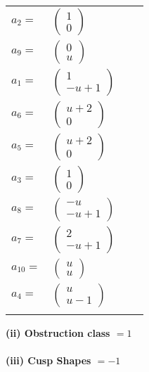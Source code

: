 \documentclass[1p]{elsarticle_modified}
\theoremstyle{definition}
\begin{document}
\begin{tabular}{m{7pt} m{180pt} m{7pt} m{180pt} }
\flushright $a_{2}=$&$\begin{pmatrix}1\\0\end{pmatrix}$ \\
\flushright $a_{9}=$&$\begin{pmatrix}0\\u\end{pmatrix}$ \\
\flushright $a_{1}=$&$\begin{pmatrix}1\\- u+1\end{pmatrix}$ \\
\flushright $a_{6}=$&$\begin{pmatrix}u+2\\0\end{pmatrix}$ \\
\flushright $a_{5}=$&$\begin{pmatrix}u+2\\0\end{pmatrix}$ \\
\flushright $a_{3}=$&$\begin{pmatrix}1\\0\end{pmatrix}$ \\
\flushright $a_{8}=$&$\begin{pmatrix}- u\\- u+1\end{pmatrix}$ \\
\flushright $a_{7}=$&$\begin{pmatrix}2\\- u+1\end{pmatrix}$ \\
\flushright $a_{10}=$&$\begin{pmatrix}u\\u\end{pmatrix}$ \\
\flushright $a_{4}=$&$\begin{pmatrix}u\\u-1\end{pmatrix}$\\&\end{tabular}
\flushleft \textbf{(ii) Obstruction class $= 1$}\\~\\
\flushleft \textbf{(iii) Cusp Shapes $= -1$}\\~\\
\end{document}
